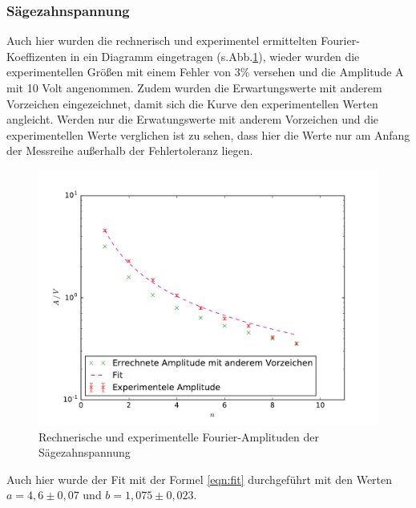 \subsubsection{Sägezahnspannung}
Auch hier wurden die rechnerisch und experimentel ermittelten Fourier-Koeffizenten in
ein Diagramm eingetragen (s.Abb.\ref{fig:dp}), wieder wurden
die experimentellen Größen mit einem Fehler von 3\% versehen und die Amplitude A mit 10 Volt
angenommen.
Zudem wurden die Erwartungswerte mit anderem Vorzeichen eingezeichnet, damit sich die
 Kurve den experimentellen Werten angleicht.
Werden nur die Erwatungswerte mit anderem Vorzeichen und die experimentellen Werte verglichen
 ist zu sehen, dass hier die Werte nur am Anfang der Messreihe außerhalb der Fehlertoleranz liegen.
\begin{figure}
  \centering
  \includegraphics[width= \textwidth]{Plots/Dreieckplot.pdf}
  \caption{Rechnerische und experimentelle Fourier-Amplituden der Sägezahnspannung}
  \label{fig:dp}
\end{figure}
\FloatBarrier
Auch hier wurde der Fit mit der Formel \eqref{eqn:fit} durchgeführt mit den Werten
$a = 4,6 \pm 0,07 $ und $ b = 1,075 \pm 0,023 $.
